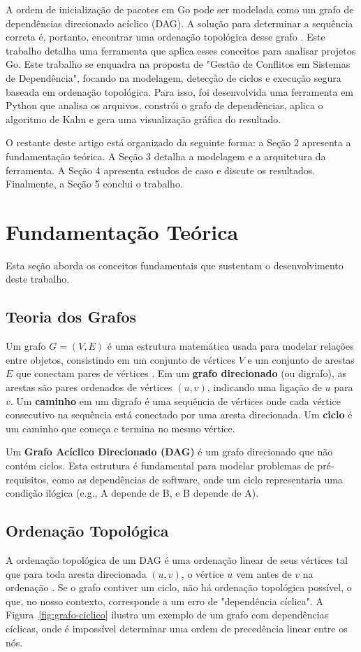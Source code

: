 \documentclass[12pt]{article}
\begin{document}
A ordem de inicialização de pacotes em Go pode ser modelada como um grafo de dependências direcionado acíclico (DAG). A solução para determinar a sequência correta é, portanto, encontrar uma ordenação topológica desse grafo \cite{clrs}. Este trabalho detalha uma ferramenta que aplica esses conceitos para analisar projetos Go. Este trabalho se enquadra na proposta de "Gestão de Conflitos em Sistemas de Dependência", focando na modelagem, detecção de ciclos e execução segura baseada em ordenação topológica. Para isso, foi desenvolvida uma ferramenta em Python que analisa os arquivos, constrói o grafo de dependências, aplica o algoritmo de Kahn e gera uma visualização gráfica do resultado.

O restante deste artigo está organizado da seguinte forma: a Seção 2 apresenta a fundamentação teórica. A Seção 3 detalha a modelagem e a arquitetura da ferramenta. A Seção 4 apresenta estudos de caso e discute os resultados. Finalmente, a Seção 5 conclui o trabalho.

\section{Fundamentação Teórica}
Esta seção aborda os conceitos fundamentais que sustentam o desenvolvimento deste trabalho.

\subsection{Teoria dos Grafos}
Um grafo $G = (V, E)$ é uma estrutura matemática usada para modelar relações entre objetos, consistindo em um conjunto de vértices $V$ e um conjunto de arestas $E$ que conectam pares de vértices \cite{clrs}. Em um \textbf{grafo direcionado} (ou digrafo), as arestas são pares ordenados de vértices $(u, v)$, indicando uma ligação de $u$ para $v$. Um \textbf{caminho} em um digrafo é uma sequência de vértices onde cada vértice consecutivo na sequência está conectado por uma aresta direcionada. Um \textbf{ciclo} é um caminho que começa e termina no mesmo vértice.

Um \textbf{Grafo Acíclico Direcionado (DAG)} é um grafo direcionado que não contém ciclos. Esta estrutura é fundamental para modelar problemas de pré-requisitos, como as dependências de software, onde um ciclo representaria uma condição ilógica (e.g., A depende de B, e B depende de A).

\subsection{Ordenação Topológica}
A ordenação topológica de um DAG é uma ordenação linear de seus vértices tal que para toda aresta direcionada $(u, v)$, o vértice $u$ vem antes de $v$ na ordenação \cite{clrs}. Se o grafo contiver um ciclo, não há ordenação topológica possível, o que, no nosso contexto, corresponde a um erro de "dependência cíclica". A Figura~\ref{fig:grafo-ciclico} ilustra um exemplo de um grafo com dependências cíclicas, onde é impossível determinar uma ordem de precedência linear entre os nós.
\end{document}
